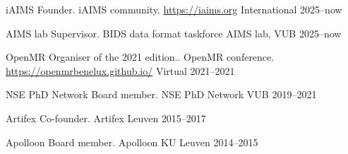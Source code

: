 
\begin{cvhonors}

  \cvhonor
    {iAIMS} %
    {Founder. iAIMS community. \hyperlink{https://iaims.org}{https://iaims.org}} %
    {International} %
    {2025--now \vfill} %

  \cvhonor
    {AIMS lab} %
    {Supervisor. BIDS data format taskforce} %
    {AIMS lab, VUB} %
    {2025--now \vfill} %

  \cvhonor
    {OpenMR} %
    {Organiser of the 2021 edition.. OpenMR conference. \hyperlink{https://openmrbenelux.github.io/}{https://openmrbenelux.github.io/}} %
    {Virtual} %
    {2021--2021 \vfill} %

\end{cvhonors}

\begin{cvhonors}

  \cvhonor
    {NSE PhD Network} %
    {Board member. NSE PhD Network} %
    {VUB} %
    {2019--2021 \vfill} %

  \cvhonor
    {Artifex} %
    {Co-founder. Artifex} %
    {Leuven} %
    {2015--2017 \vfill} %

  \cvhonor
    {Apolloon} %
    {Board member. Apolloon} %
    {KU Leuven} %
    {2014--2015 \vfill} %

\end{cvhonors}